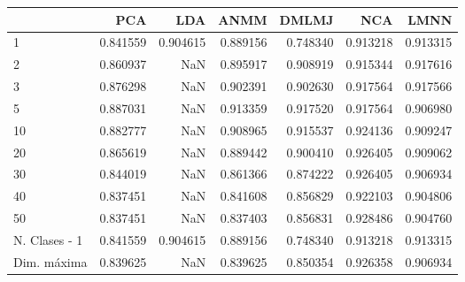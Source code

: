 \begin{tabular}{lrrrrrr}
\toprule
{} &       PCA &       LDA &      ANMM &     DMLMJ &       NCA &      LMNN \\
\midrule
1             &  0.841559 &  0.904615 &  0.889156 &  0.748340 &  0.913218 &  0.913315 \\
2             &  0.860937 &       NaN &  0.895917 &  0.908919 &  0.915344 &  0.917616 \\
3             &  0.876298 &       NaN &  0.902391 &  0.902630 &  0.917564 &  0.917566 \\
5             &  0.887031 &       NaN &  0.913359 &  0.917520 &  0.917564 &  0.906980 \\
10            &  0.882777 &       NaN &  0.908965 &  0.915537 &  0.924136 &  0.909247 \\
20            &  0.865619 &       NaN &  0.889442 &  0.900410 &  0.926405 &  0.909062 \\
30            &  0.844019 &       NaN &  0.861366 &  0.874222 &  0.926405 &  0.906934 \\
40            &  0.837451 &       NaN &  0.841608 &  0.856829 &  0.922103 &  0.904806 \\
50            &  0.837451 &       NaN &  0.837403 &  0.856831 &  0.928486 &  0.904760 \\
N. Clases - 1 &  0.841559 &  0.904615 &  0.889156 &  0.748340 &  0.913218 &  0.913315 \\
Dim. máxima   &  0.839625 &       NaN &  0.839625 &  0.850354 &  0.926358 &  0.906934 \\
\bottomrule
\end{tabular}
